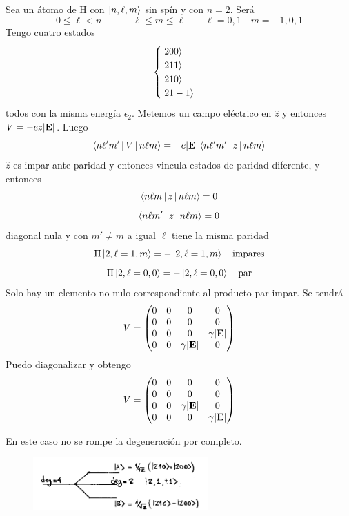 \documentclass[10pt,oneside]{CBFT_book}
\begin{document}
Sea un átomo de H con $\Ket{n,\ell,m}$ sin spín y con $n=2$. Será 
\[
	0 \leq \ell < n \qquad -\ell \leq m\leq \ell \qquad \ell=0,1 \quad m=-1,0,1
\]
Tengo cuatro estados 
\[
	\begin{cases}
	 \Ket{200} \\
	 \Ket{211} \\
	 \Ket{210} \\
	 \Ket{21-1} \\
	\end{cases}
\]
todos con la misma energía $\epsilon_2$.
Metemos un campo eléctrico en $\hat{z}$ y entonces $V=-ez|\vb{E}|$. Luego 
\[
	\Braket{n\ell'm'|V|n\ell m} = -e|\vb{E}|\Braket{n\ell'm'|z|n\ell m}
\]
$\hat{z}$ es impar ante paridad y entonces vincula estados de paridad diferente,
y entonces 
\[
	\Braket{n\ell m|z|n\ell m} = 0 
\]
\[
	\Braket{n\ell m'|z|n\ell m} = 0 
\]
diagonal nula y con $m'\neq m$ a igual $\ell$ tiene la misma paridad
\[
	\Pi \Ket{2,\ell=1,m} = -\Ket{2,\ell=1,m} \quad \text{impares}
\]
\[
	\Pi \Ket{2,\ell=0,0} = -\Ket{2,\ell=0,0} \quad \text{par}
\]
Solo hay un elemento no nulo correspondiente al producto par-impar.
Se tendrá 
\[
	V = \begin{pmatrix}
	   0 & 0 & 0 & 0 \\
	   0 & 0 & 0 & 0 \\
	   0 & 0 & 0 & \gamma|\vb{E}| \\
	   0 & 0 & \gamma|\vb{E}| & 0
	  \end{pmatrix}
\]
Puedo diagonalizar y obtengo 
\[
	V = \begin{pmatrix}
	   0 & 0 & 0 & 0 \\
	   0 & 0 & 0 & 0 \\
	   0 & 0 & \gamma|\vb{E}| & 0 \\	   
	   0 & 0 & 0 & \gamma|\vb{E}| 
	  \end{pmatrix}
\]

En este caso no se rompe la degeneración por completo.

\begin{figure}[htb]
	\begin{center}
	\includegraphics[width=0.6\textwidth]{images/teo2_20.pdf}
	\end{center}
	\caption{}
\end{figure} 
\end{document}
